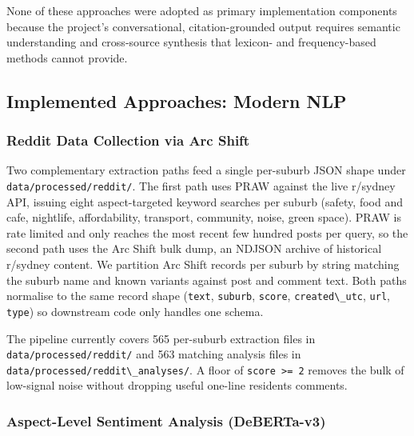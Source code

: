 \documentclass[11pt,a4paper]{article}
\newcommand{\passthrough}[1]{#1}
\begin{document}
None of these approaches were adopted as primary implementation components because the project's conversational, citation-grounded output requires semantic understanding and cross-source synthesis that lexicon- and frequency-based methods cannot provide.



\subsection{Implemented Approaches: Modern NLP}\label{53-implemented-approaches-modern-nlp}

\subsubsection{Reddit Data Collection via Arc Shift}\label{531-reddit-data-collection-via-arc-shift}

Two complementary extraction paths feed a single per-suburb JSON shape under \passthrough{\lstinline!data/processed/reddit/!}. The first path uses PRAW against the live r/sydney API, issuing eight aspect-targeted keyword searches per suburb (safety, food and cafe, nightlife, affordability, transport, community, noise, green space). PRAW is rate limited and only reaches the most recent few hundred posts per query, so the second path uses the Arc Shift bulk dump, an NDJSON archive of historical r/sydney content. We partition Arc Shift records per suburb by string matching the suburb name and known variants against post and comment text. Both paths normalise to the same record shape (\passthrough{\lstinline!text!}, \passthrough{\lstinline!suburb!}, \passthrough{\lstinline!score!}, \passthrough{\lstinline!created\_utc!}, \passthrough{\lstinline!url!}, \passthrough{\lstinline!type!}) so downstream code only handles one schema.

The pipeline currently covers 565 per-suburb extraction files in \passthrough{\lstinline!data/processed/reddit/!} and 563 matching analysis files in \passthrough{\lstinline!data/processed/reddit\_analyses/!}. A floor of \passthrough{\lstinline!score >= 2!} removes the bulk of low-signal noise without dropping useful one-line residents\textquotesingle{} comments.

\subsubsection{Aspect-Level Sentiment Analysis (DeBERTa-v3)}\label{532-aspect-level-sentiment-analysis-deberta}
\end{document}
